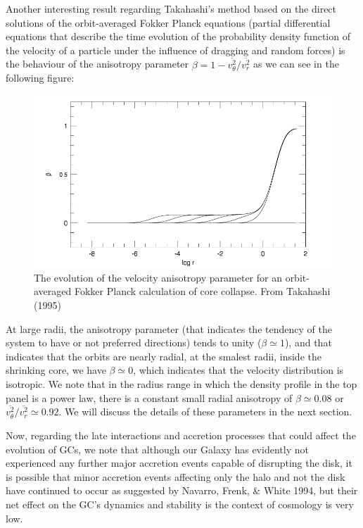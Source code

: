 Another interesting result regarding Takahashi's method based on the direct solutions of the orbit-averaged Fokker Planck equations (partial differential equations that describe the time evolution of the probability density function of the velocity of a particle under the influence of dragging and random forces) is the behaviour of the anisotropy parameter $\beta=1-\overline{v_{\theta}^{2}}/\overline{v_{r}^{2}}$ as we can see in the following figure:

\begin{figure}[H]
\centering
\includegraphics[width=12cm]{images/anisotropy_core_collapse.png}
\caption[Evolution of the velocity anisotropy parameter]{The evolution of the velocity anisotropy parameter for an orbit-averaged Fokker Planck calculation of core collapse. From Takahashi (1995)}
\end{figure}

At large radii, the anisotropy parameter (that indicates the tendency of the system to have or not preferred directions) tends to unity ($\beta\simeq1$), and that indicates that the orbits are nearly radial, at the smalest radii, inside the shrinking core, we have $\beta\simeq0$, which indicates that the velocity distribution is isotropic. We note that in the radius range in which the density profile in the top panel is a power law, there is a constant small radial anisotropy of $\beta\simeq0.08$ or  $\overline{v_{\theta}^{2}}/\overline{v_{r}^{2}}\simeq0.92$. We will discuss the details of these parameters in the next section.

Now, regarding the late interactions and accretion processes that could affect the evolution of GCs, we note that although our Galaxy has evidently not experienced any further major accretion events capable of disrupting the disk, it is possible that minor accretion events affecting only the halo and not the disk have continued to occur as suggested by Navarro, Frenk, \& White 1994, but their net effect on the GC's dynamics and stability is the context of cosmology is very low.

